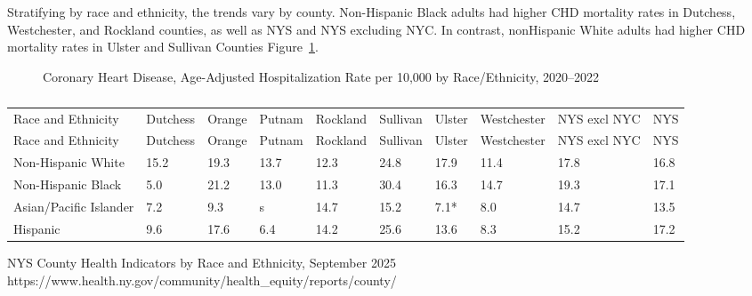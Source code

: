 \documentclass[
  english,
  letterpaper,
]{report}
\begin{document}
Stratifying by race and ethnicity, the trends vary by county.
Non-Hispanic Black adults had higher CHD mortality rates in Dutchess,
Westchester, and Rockland counties, as well as NYS and NYS excluding
NYC. In contrast, nonHispanic White adults had higher CHD mortality
rates in Ulster and Sullivan Counties
Figure~\ref{fig-congheartfail-mortal-rande}.

\begin{figure}


\caption{\label{fig-congheartfail-mortal-rande}Coronary Heart Disease,
Age-Adjusted Hospitalization Rate per 10,000 by Race/Ethnicity,
2020--2022}

\end{figure}%

\begin{longtable}[]{@{}llllllllll@{}}

\caption{\label{tbl-congheartfail-mortal-rande}Coronary Heart Disease,
Age-Adjusted Hospitalization Rate per 10,000 by Race/Ethnicity,
2020--2022}

\tabularnewline

\caption{}\label{T_ece26}\tabularnewline
\toprule\noalign{}
Race and Ethnicity & Dutchess & Orange & Putnam & Rockland & Sullivan &
Ulster & Westchester & NYS excl NYC & NYS \\
\midrule\noalign{}
\endfirsthead
\toprule\noalign{}
Race and Ethnicity & Dutchess & Orange & Putnam & Rockland & Sullivan &
Ulster & Westchester & NYS excl NYC & NYS \\
\midrule\noalign{}
\endhead
\bottomrule\noalign{}
\endlastfoot
Non-Hispanic White & 15.2 & 19.3 & 13.7 & 12.3 & 24.8 & 17.9 & 11.4 &
17.8 & 16.8 \\
Non-Hispanic Black & 5.0 & 21.2 & 13.0 & 11.3 & 30.4 & 16.3 & 14.7 &
19.3 & 17.1 \\
Asian/Pacific Islander & 7.2 & 9.3 & s & 14.7 & 15.2 & 7.1* & 8.0 & 14.7
& 13.5 \\
Hispanic & 9.6 & 17.6 & 6.4 & 14.2 & 25.6 & 13.6 & 8.3 & 15.2 & 17.2 \\

\end{longtable}

\begin{tcolorbox}[enhanced jigsaw, breakable, leftrule=.75mm, title=\textcolor{quarto-callout-note-color}{\faInfo}\hspace{0.5em}{Source}, bottomrule=.15mm, opacityback=0, left=2mm, colback=white, bottomtitle=1mm, coltitle=black, colbacktitle=quarto-callout-note-color!10!white, colframe=quarto-callout-note-color-frame, opacitybacktitle=0.6, toptitle=1mm, titlerule=0mm, arc=.35mm, rightrule=.15mm, toprule=.15mm]

NYS County Health Indicators by Race and Ethnicity, September 2025
https://www.health.ny.gov/community/health\_equity/reports/county/

\end{tcolorbox}
\end{document}
